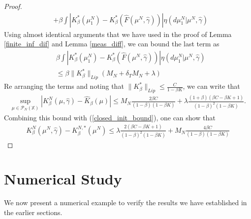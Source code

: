\documentclass[twoside,11pt]{article}
\def\P{{\mathcal P}}
\begin{document}
\begin{proof}
\begin{align*}
& +  \beta \int \left| {K}^*_\beta (\mu_1^N) - {K}^*_\beta  \left(\hat{F}(\mu^N,\hat{\gamma})  \right)\right| \eta(d\mu_1^N|\mu^N,\hat{\gamma})  
\end{align*}
Using almost identical arguments that we have used in the proof of Lemma \ref{finite_inf_dif} and Lemma \ref{meas_diff}, we can bound the last term as
\begin{align*}
 &\beta \int \left| {K}^*_\beta (\mu_1^N) - {K}^*_\beta  \left(\hat{F}(\mu^N,\hat{\gamma})  \right)\right| \eta(d\mu_1^N|\mu^N,\hat{\gamma})\\
&  \leq  \beta\|K_\beta^*\|_{Lip} \left( M_N +\delta_T M_N + \lambda \right)
\end{align*}
Re arranging the terms and noting that $\|K_\beta^*\|_{Lip} \leq \frac{C}{1-\beta K}$, we can write that 
\begin{align*}
\sup_{\mu\in \P_N(\mathds{X})} \left|K_\beta^N(\mu,\hat{\gamma}) - \hat{K}_\beta(\mu)\right| \leq M_N \frac{2\beta C}{(1-\beta)(1-\beta K)} + \lambda \frac{(1+\beta )(\beta C - \beta K +1) }{ (1-\beta)^2(1-\beta K)}.
\end{align*}
Combining this bound with (\ref{closed_init_bound}), one can show that 
\begin{align*}
K_\beta^N(\mu^N,\hat{\gamma}) - K_\beta^{N,*}(\mu^N) \leq \lambda  \frac{2(\beta C - \beta K +1) }{ (1-\beta)^2(1-\beta K)}  + M_N  \frac{4\beta C}{(1-\beta)(1-\beta K)} 
\end{align*}


\end{proof}


\section{Numerical Study} We now present a numerical example to verify the results we have established  in the earlier sections.
\end{document}
